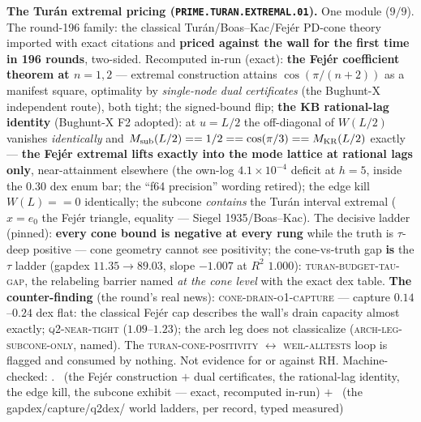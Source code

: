 \documentclass[11pt,a4paper]{article}
\theoremstyle{definition}
\begin{document}
\par\smallskip\noindent\textbf{The Tur\'an extremal pricing
(\texttt{PRIME.\allowbreak TURAN.\allowbreak EXTREMAL.01}).}
One module ($9/9$).  The round-196 family: the classical
Tur\'an/Boas--Kac/Fej\'er PD-cone theory imported with exact
citations and \textbf{priced against the wall for the first time
in 196 rounds}, two-sided.  Recomputed in-run (exact):
\textbf{the Fej\'er coefficient theorem at $n = 1, 2$} ---
extremal construction attains $\cos(\pi/(n + 2))$ as a manifest
square, optimality by \emph{single-node dual certificates} (the
Bughunt-X independent route), both tight; the signed-bound flip;
\textbf{the KB rational-lag identity} (Bughunt-X F2 adopted): at
$u = L/2$ the off-diagonal of $W(L/2)$ vanishes
\emph{identically} and $M_{\rm sub}(L/2) == 1/2 == \cos(\pi/3) ==
M_{\rm KR}(L/2)$ exactly --- \textbf{the Fej\'er extremal lifts
exactly into the mode lattice at rational lags only},
near-attainment elsewhere (the own-log $4.1\times10^{-4}$ deficit
at $h = 5$, inside the $0.30$ dex enum bar; the ``f64 precision''
wording retired); the edge kill $W(L) == 0$ identically; the
subcone \emph{contains} the Tur\'an interval extremal ($x = e_0$
the Fej\'er triangle, equality --- Siegel 1935/Boas--Kac).  The
decisive ladder (pinned): \textbf{every cone bound is negative at
every rung} while the truth is $\tau$-deep positive --- cone
geometry cannot see positivity; the cone-vs-truth gap \textbf{is}
the $\tau$ ladder (gapdex $11.35 \to 89.03$, slope $-1.007$ at
$R^2$ $1.000$): \textsc{turan-budget-tau-gap}, the relabeling
barrier named \emph{at the cone level} with the exact dex table.
\textbf{The counter-finding} (the round's real news):
\textsc{cone-drain-o1-capture} --- capture $0.14$--$0.24$ dex
flat: the classical Fej\'er cap describes the wall's drain
capacity almost exactly; \textsc{q2-near-tight}
($1.09$--$1.23$); the arch leg does not classicalize
(\textsc{arch-leg-subcone-only}, named).  The
\textsc{turan-cone-positivity} $\leftrightarrow$
\textsc{weil-alltests} loop is flagged and consumed by nothing.
Not evidence for or against RH.
Machine-checked: .
\mE\ (the Fej\'er construction $+$ dual certificates, the
rational-lag identity, the edge kill, the subcone exhibit ---
exact, recomputed in-run) $+$ \mC\ (the gapdex/capture/q2dex/
world ladders, per record, typed measured)
\par\smallskip
\end{document}
